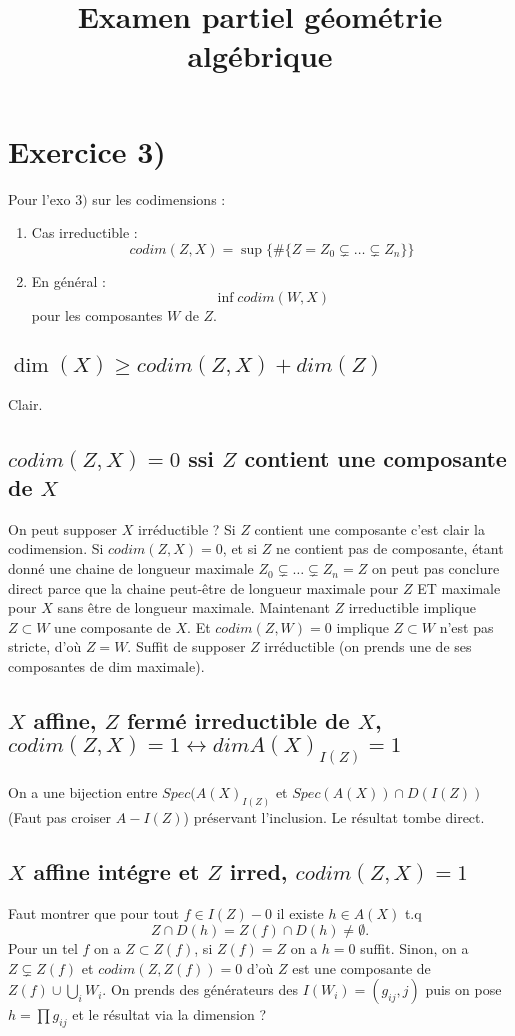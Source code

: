 \documentclass[a4paper,12pt]{book}
\title{Examen partiel géométrie algébrique}
\date{}
\theoremstyle{plain}
\theoremstyle{definition}
\theoremstyle{remark}
\begin{document}
\maketitle
\tableofcontents

\section{Exercice 3)}
Pour l'exo $3)$ sur les codimensions :
\begin{enumerate}
    \item Cas irreductible :
\[codim(Z,X)=\sup\{\#\{Z = Z_0\subsetneq\ldots\subsetneq Z_n\}\}\]
    \item En général :
	\[\inf codim(W,X)\]
	pour les composantes $W$ de $Z$.
\end{enumerate}
\subsection{$\dim(X)\geq codim(Z,X)+dim(Z)$}
Clair.
\subsection{$codim(Z,X)=0$ ssi $Z$ contient une composante de $X$}
On peut supposer $X$ irréductible ? Si $Z$ contient une composante
c'est clair la codimension. Si $codim(Z,X)=0$, et si $Z$ ne contient
pas de composante, étant donné une chaine de longueur maximale 
$Z_0\subsetneq\ldots\subsetneq Z_n=Z$ on peut pas conclure direct
parce que la chaine peut-être de longueur maximale pour $Z$ ET maximale
pour $X$ sans être de longueur maximale. Maintenant $Z$ irreductible
implique $Z\subset W$ une composante de $X$. Et $codim(Z,W)=0$ implique
$Z\subset W$ n'est pas stricte, d'où $Z=W$.
\newline
Suffit de supposer $Z$ irréductible (on prends une de ses composantes
de dim maximale).

\subsection{$X$ affine, $Z$ fermé irreductible de $X$, 
$codim(Z,X)=1\leftrightarrow dim A(X)_{I(Z)}=1$}
On a une bijection entre $Spec(A(X)_{I(Z)}$ et $Spec(A(X))\cap D(I(Z))$
(Faut pas croiser $A-I(Z)$) préservant l'inclusion.
Le résultat tombe direct.
\subsection{$X$ affine intégre et $Z$ irred, $codim(Z,X)=1$}
Faut montrer que pour tout $f\in I(Z)-0$ il existe $h\in A(X)$ t.q
\[Z\cap D(h)=Z(f)\cap D(h)\ne \emptyset.\]
Pour un tel $f$ on a $Z\subset Z(f)$, si $Z(f)=Z$ on a $h=0$ suffit.
Sinon, on a $Z\subsetneq Z(f)$ et $codim(Z,Z(f))=0$ d'où
$Z$ est une composante de $Z(f)\cup \bigcup_i W_i$. On prends des
générateurs des $I(W_i)=(g_{ij},j)$ puis on pose $h=\prod g_{ij}$ et
le résultat via la dimension ?
\end{document}
